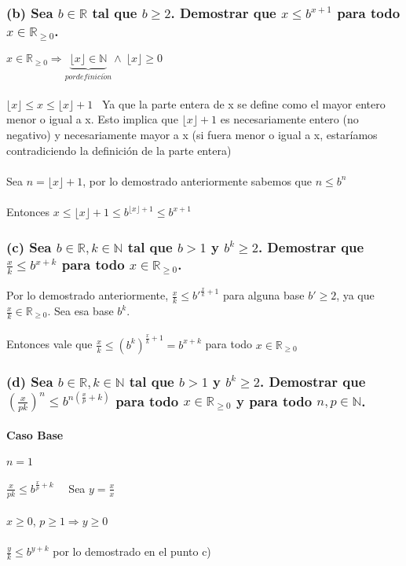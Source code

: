 \documentclass[10pt, a4paper]{article}
\begin{document}
\subsubsection*{(b) Sea $b \in \mathbb{R}$ tal que $b \ge 2$. Demostrar que $x\le b^{x+1}$ para todo $x\in \mathbb R_{\ge 0}$.}

$x\in \mathbb R_{\ge 0} \Rightarrow \underbrace{\lfloor x \rfloor \in \mathbb{N}}_{por definici\acute{o}n} \wedge  \ \lfloor x \rfloor \ge 0$ \\ \\
$\lfloor x \rfloor \le x \le \lfloor x \rfloor + 1$ \ Ya que la parte entera de x se define como el mayor entero menor o igual a x. Esto implica que $\lfloor x \rfloor + 1$ es necesariamente entero (no negativo) y necesariamente mayor a x (si fuera menor o igual a x, estaríamos contradiciendo la definición de la parte entera)\\ \\

Sea $n = \lfloor x \rfloor + 1$, por lo demostrado anteriormente sabemos que $n \le b^n$\\ \\
Entonces $x \le \lfloor x \rfloor + 1 \le b^{\lfloor x \rfloor + 1} \le b^{x + 1}$

\subsubsection*{(c) Sea $b \in \mathbb{R}, k \in \mathbb{N}$ tal que $b > 1$ y $b^k \ge 2$. Demostrar que $\frac{x}{k}\le b^{x+k}$ para todo $x\in \mathbb R_{\ge 0}$.}

Por lo demostrado anteriormente, $\frac{x}{k} \le b'^{\frac{x}{k} + 1}$ para alguna base $b' \ge 2$, ya que $\frac{x}{k} \in \mathbb R_{\ge 0}$. Sea esa base $b^k$.\\ \\
Entonces vale que $\frac{x}{k}\le (b^k)^{\frac{x}{k} + 1} = b^{x+k}$ para todo $x\in \mathbb R_{\ge 0}$

\subsubsection*{(d) Sea $b \in \mathbb{R}, k \in \mathbb{N}$ tal que $b > 1$ y $b^k \ge 2$. Demostrar que $(\frac{x}{pk})^n \le b^{n(\frac{x}{p} + k)}$ para todo $x\in \mathbb R_{\ge 0}$ y para todo $n, p \in \mathbb{N}$.}

\paragraph*{Caso Base}
$n = 1$ \\ \\
$\frac{x}{pk} \le b^{\frac{x}{p} + k}$ \  \ Sea $y = \frac{x}{x}$\\ \\
$x \ge 0$, $p \ge 1 \Rightarrow y \ge 0$ \\ \\
$\frac{y}{k}\le b^{y+k}$ por lo demostrado en el punto c)
\end{document}
